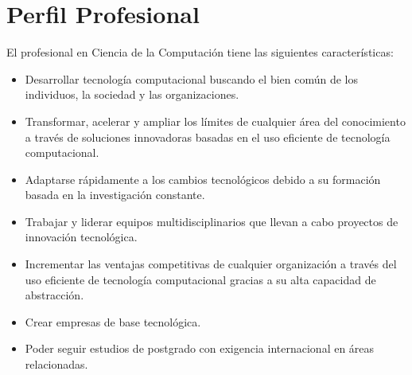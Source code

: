 \section{Perfil Profesional}\label{sec:professional-profile}
El profesional en Ciencia de la Computación tiene las siguientes características:

\begin{itemize}
\item Desarrollar tecnología computacional buscando el bien común de los individuos, la sociedad y las organizaciones.
\item Transformar, acelerar y ampliar los límites de cualquier área del conocimiento a través de soluciones innovadoras basadas en el uso eficiente de tecnología computacional.
\item Adaptarse rápidamente a los cambios tecnológicos debido a su formación basada en la investigación constante.
\item Trabajar y liderar equipos multidisciplinarios que llevan a cabo proyectos de innovación tecnológica.
\item Incrementar las ventajas competitivas de cualquier organización a través del uso eficiente de tecnología computacional gracias a su alta capacidad de abstracción.
\item Crear empresas de base tecnológica.
\item Poder seguir estudios de postgrado con exigencia internacional en áreas relacionadas.
\end{itemize}

